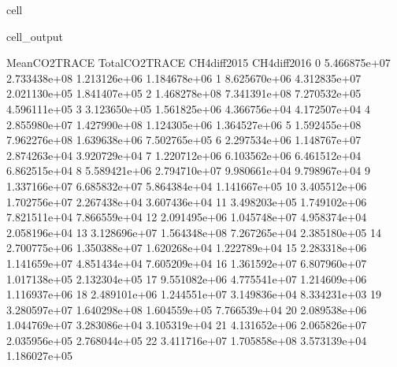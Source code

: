 \documentclass[letterpaper,10pt,english]{jupyterBook}
\begin{document}
\begin{sphinxuseclass}{cell}
\begin{sphinxVerbatimOutput}
\begin{sphinxuseclass}{cell_output}
\begin{sphinxVerbatim}[commandchars=\\\{\}]
    Mean\PYGZus{}CO2\PYGZus{}TRACE  Total\PYGZus{}CO2\PYGZus{}TRACE  CH4\PYGZus{}diff\PYGZus{}2015  CH4\PYGZus{}diff\PYGZus{}2016  \PYGZbs{}
0     5.466875e+07     2.733438e+08  \PYGZhy{}1.213126e+06  \PYGZhy{}1.184678e+06   
1     8.625670e+06     4.312835e+07  \PYGZhy{}2.021130e+05  \PYGZhy{}1.841407e+05   
2     1.468278e+08     7.341391e+08  \PYGZhy{}7.270532e+05  \PYGZhy{}4.596111e+05   
3     3.123650e+05     1.561825e+06   4.366756e+04   4.172507e+04   
4     2.855980e+07     1.427990e+08   1.124305e+06   1.364527e+06   
5     1.592455e+08     7.962276e+08  \PYGZhy{}1.639638e+06  \PYGZhy{}7.502765e+05   
6     2.297534e+06     1.148767e+07   2.874263e+04   3.920729e+04   
7     1.220712e+06     6.103562e+06   6.461512e+04   6.862515e+04   
8     5.589421e+06     2.794710e+07   9.980661e+04   9.798967e+04   
9     1.337166e+07     6.685832e+07  \PYGZhy{}5.864384e+04  \PYGZhy{}1.141667e+05   
10    3.405512e+06     1.702756e+07   2.267438e+04   3.607436e+04   
11    3.498203e+05     1.749102e+06   7.821511e+04   7.866559e+04   
12    2.091495e+06     1.045748e+07   4.958374e+04   2.058196e+04   
13    3.128696e+07     1.564348e+08  \PYGZhy{}7.267265e+04  \PYGZhy{}2.385180e+05   
14    2.700775e+06     1.350388e+07   1.620268e+04   1.222789e+04   
15    2.283318e+06     1.141659e+07   4.851434e+04   7.605209e+04   
16    1.361592e+07     6.807960e+07  \PYGZhy{}1.017138e+05  \PYGZhy{}2.132304e+05   
17    9.551082e+06     4.775541e+07   1.214609e+06   1.116937e+06   
18    2.489101e+06     1.244551e+07  \PYGZhy{}3.149836e+04  \PYGZhy{}8.334231e+03   
19    3.280597e+07     1.640298e+08   1.604559e+05  \PYGZhy{}7.766539e+04   
20    2.089538e+06     1.044769e+07  \PYGZhy{}3.283086e+04  \PYGZhy{}3.105319e+04   
21    4.131652e+06     2.065826e+07   2.035956e+05   2.768044e+05   
22    3.411716e+07     1.705858e+08   3.573139e+04  \PYGZhy{}1.186027e+05   


\end{sphinxVerbatim}
\end{sphinxuseclass}
\end{sphinxVerbatimOutput}
\end{sphinxuseclass}
\end{document}
